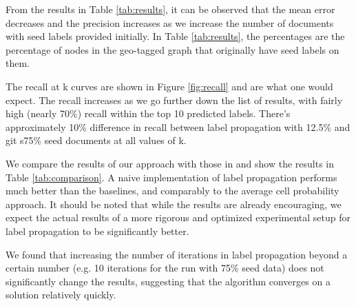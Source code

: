 From the results in Table \ref{tab:results}, it can be observed that the mean
error decreases and the precision increases as we increase the number of
documents with seed labels provided initially. In Table \ref{tab:results}, the
percentages are the percentage of nodes in the geo-tagged graph that
originally have seed labels on them.

The recall at k curves are shown in Figure \ref{fig:recall} and are what one
would expect. The recall increases as we go further down the list of results,
with fairly high (nearly 70\%) recall within the top 10 predicted labels.
There's approximately 10\% difference in recall between label propagation with
12.5\% and git s75\% seed documents at all values of k.

We compare the results of our approach with those in 
and show the results in Table \ref{tab:comparison}. A naive implementation of
label propagation performs much better than the baselines, and comparably to
the average cell probability approach. It should be noted that while the
results are already encouraging, we expect the actual results of a more
rigorous and optimized experimental setup for label propagation to be
significantly better.

We found that increasing the number of iterations in label propagation beyond
a certain number (e.g. 10 iterations for the run with 75\% seed data) does not
significantly change the results, suggesting that the algorithm converges on a
solution relatively quickly.
